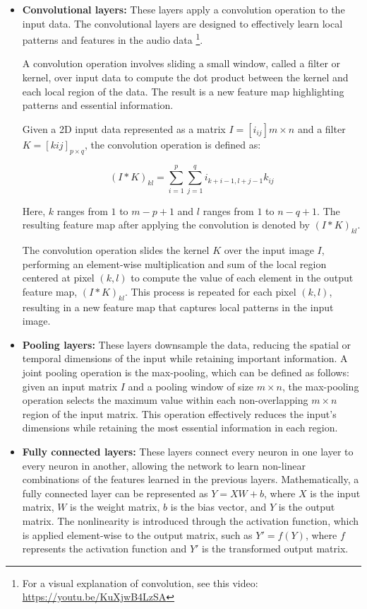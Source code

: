 \begin{itemize}

\item \textbf{Convolutional layers:} These layers apply a convolution operation to the input data. The convolutional layers are designed to effectively learn local patterns and features in the audio data \footnote{For a visual explanation of convolution, see this video: \url{https://youtu.be/KuXjwB4LzSA}}.

A convolution operation involves sliding a small window, called a filter or kernel, over input data to compute the dot product between the kernel and each local region of the data. The result is a new feature map highlighting patterns and essential information.

Given a 2D input data represented as a matrix $I = [i_{ij}]{m \times n}$ and a filter $K = [k{ij}]_{p \times q}$, the convolution operation is defined as:

$$(I * K)_{kl} = \sum_{i=1}^{p} \sum_{j=1}^{q} i_{k+i-1, l+j-1}k_{ij}$$

Here, $k$ ranges from $1$ to $m-p+1$ and $l$ ranges from $1$ to $n-q+1$. The resulting feature map after applying the convolution is denoted by $(I * K)_{kl}$.

The convolution operation slides the kernel $K$ over the input image $I$, performing an element-wise multiplication and sum of the local region centered at pixel $(k,l)$ to compute the value of each element in the output feature map, $(I * K)_{kl}$. This process is repeated for each pixel $(k,l)$, resulting in a new feature map that captures local patterns in the input image.



\item \textbf{Pooling layers:} These layers downsample the data, reducing the spatial or temporal dimensions of the input while retaining important information. A joint pooling operation is the max-pooling, which can be defined as follows: given an input matrix $I$ and a pooling window of size $m \times n$, the max-pooling operation selects the maximum value within each non-overlapping $m \times n$ region of the input matrix. This operation effectively reduces the input's dimensions while retaining the most essential information in each region.
\vspace*{3mm}

\item \textbf{Fully connected layers:} These layers connect every neuron in one layer to every neuron in another, allowing the network to learn non-linear combinations of the features learned in the previous layers. Mathematically, a fully connected layer can be represented as $Y = XW + b$, where $X$ is the input matrix, $W$ is the weight matrix, $b$ is the bias vector, and $Y$ is the output matrix. The nonlinearity is introduced through the activation function, which is applied element-wise to the output matrix, such as $Y' = f(Y)$, where $f$ represents the activation function and $Y'$ is the transformed output matrix.
\vspace*{3mm}


\end{itemize}
